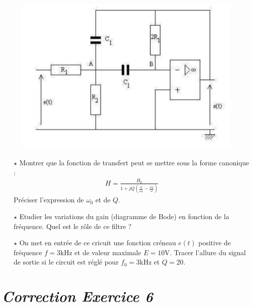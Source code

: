 \documentclass{report}
\begin{document}
\begin{figure}[!h]
\centering
\includegraphics[width=0.5\linewidth]{circuit_12.png}
\end{figure}

\begin{itemize}

	\item[$\star$] Montrer que la fonction de transfert peut se mettre sous la forme canonique :
	\begin{align*}
		H=\frac{H_0}{1+jQ\left(\frac{\omega}{\omega_0}-\frac{\omega_0}{\omega} \right) }
	\end{align*}
Préciser l'expression de $\omega_0$ et de $Q$. 

	\item[$\star$] Etudier les variations du gain (diagramme de Bode) en fonction de la fréquence. Quel est le rôle de ce filtre ?
	
	\item[$\star$] On met en entrée de ce cricuit une fonction créneau $e(t)$ positive de fréquence $f=3$kHz et de valeur maximale $E=10$V. Tracer l'allure du signal de sortie si le circuit est réglé pour $f_0=3$kHz et $Q=20$.
\end{itemize}

\newpage	

\section*{\textit{Correction Exercice 6}}
\end{document}
